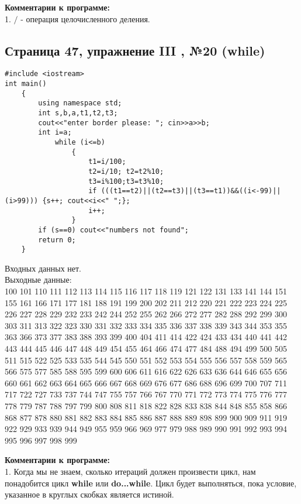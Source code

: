 \documentclass[11pt]{article}
\begin{document}
\begin{flushleft}
\textbf{Комментарии к программе:} \\
1. $/$ - операция целочисленного деления.
\newpage
\begin{center}
\section{Страница 47, упражнение III , №20 (while)}
\end{center}
\begin{lstlisting}
#include <iostream>
int main()
	{
		using namespace std;
		int s,b,a,t1,t2,t3;
		cout<<"enter border please: "; cin>>a>>b;
		int i=a;
			while (i<=b)
				{
					t1=i/100;
					t2=i/10; t2=t2%10;
					t3=i%100;t3=t3%10;
					if (((t1==t2)||(t2==t3)||(t3==t1))&&((i<-99)||(i>99))) {s++; cout<<i<<" ";};
					i++;
				}
		if (s==0) cout<<"numbers not found";
		return 0;
	}

\end{lstlisting}

\begin{center}Входных данных нет.\\ Выходные данные:\\
100 101 110 111 112 113 114 115 116 117 118 119 121 122 131 133 141 144 151 155 161 166 171 177 181 188 191 199 200 202 211 212 220 221 222 223 224 225 226 227 228 229 232 233 242 244 252 255 262 266 272 277 282 288 292 299 300 303 311 313 322 323 330 331 332 333 334 335 336 337 338 339 343 344 353 355 363 366 373 377 383 388 393 399 400 404 411 414 422 424 433 434 440 441 442 443 444 445 446 447 448 449 454 455 464 466 474 477 484 488 494 499 500 505 511 515 522 525 533 535 544 545 550 551 552 553 554 555 556 557 558 559 565 566 575 577 585 588 595 599 600 606 611 616 622 626 633 636 644 646 655 656 660 661 662 663 664 665 666 667 668 669 676 677 686 688 696 699 700 707 711 717 722 727 733 737 744 747 755 757 766 767 770 771 772 773 774 775 776 777 778 779 787 788 797 799 800 808 811 818 822 828 833 838 844 848 855 858 866 868 877 878 880 881 882 883 884 885 886 887 888 889 898 899 900 909 911 919 922 929 933 939 944 949 955 959 966 969 977 979 988 989 990 991 992 993 994 995 996 997 998 999 \end{center}

\textbf{Комментарии к программе:} \\
1. Когда мы не знаем, сколько итераций должен произвести цикл, нам понадобится цикл \textbf{while} или \textbf{do...while}. Цикл будет выполняться, пока условие, указанное в круглых скобках является истиной. 



\end{flushleft}
\end{document}
